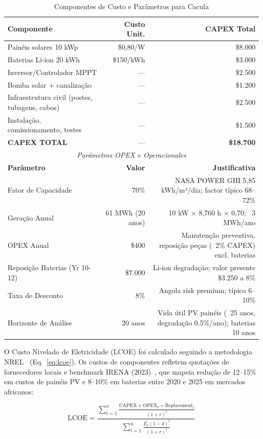 \documentclass[12pt, a4paper]{article}
\begin{document}
{{{{{{{{{{{{\begin{table}[H]
\centering
\caption{Componentes de Custo e Parâmetros para Cacula}
\label{tab:cacula_lcoe}
\small
\begin{tabular}{|l|r|r|}
\hline
\textbf{Componente} & \textbf{Custo Unit.} & \textbf{CAPEX Total} \\
\hline
Painéis solares 10 kWp & \$0,80/W & \$8.000 \\
Baterias Li-ion 20 kWh & \$150/kWh & \$3.000 \\
Inversor/Controlador MPPT & --- & \$2.500 \\
Bomba solar + canalização & --- & \$1.200 \\
Infraestrutura civil (postes, tubagens, cabos) & --- & \$2.500 \\
Instalação, comissionamento, testes & --- & \$1.500 \\
\hline
\textbf{CAPEX TOTAL} & --- & \textbf{\$18.700} \\
\hline
\multicolumn{3}{c}{\textit{Parâmetros OPEX e Operacionales}} \\
\hline
\textbf{Parâmetro} & \textbf{Valor} & \textbf{Justificativa} \\
\hline
Fator de Capacidade & 70\% & NASA POWER GHI 5,85 kWh/m²/dia; factor típico 68–72\% \\
Geração Anual & 61 MWh (20 anos) & 10 kW × 8,760 h × 0,70; ~3 MWh/ano \\
OPEX Anual & \$400 & Manutenção preventiva, reposição peças (~2\% CAPEX) excl. baterias \\
Reposição Baterias (Yr 10-12) & \$7.000 & Li-ion degradação; valor presente ~\$3.250 a 8\% \\
Taxa de Desconto & 8\% & Angola risk premium; típico 6–10\% \\
Horizonte de Análise & 20 anos & Vida útil PV painéis (~25 anos, degradação 0.5\%/ano); baterias ~10 anos \\
\hline
\end{tabular}
\end{table}

O Custo Nivelado de Eletricidade (LCOE) foi calculado seguindo a metodologia NREL~\citep{NREL2020} (Eq.~\ref{eq:lcoe}). Os custos de componentes refletem quotações de fornecedores locais e benchmark IRENA (2023)~\citep{IRENA2023}, que mapeia redução de 12--15\% em custos de painéis PV e 8--10\% em baterias entre 2020 e 2025 em mercados africanos:

\begin{equation}
\label{eq:lcoe}
\text{LCOE} = \frac{\sum_{t=1}^{n} \frac{\text{CAPEX} + \text{OPEX}_t + \text{Replacement}_t}{(1+r)^t}}{\sum_{t=1}^{n} \frac{E_t(1-d)^t}{(1+r)^t}}
\end{equation}

}}}}}}}}}}}}
\end{document}
